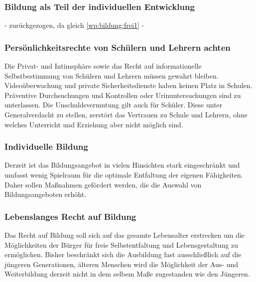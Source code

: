 \label{wp:bildung:frei2}

\subsubsection{Bildung als Teil der individuellen Entwicklung}
- zurückgezogen, da gleich \ref{wp:bildung:frei1} -
 

\subsubsection{Persönlichkeitsrechte von Schülern und Lehrern achten}
\abstimmung
Die Privat- und Intimsphäre sowie das Recht auf informationelle Selbstbestimmung von Schülern und Lehrern müssen gewahrt bleiben. Videoüberwachung und private Sicherheitsdienste haben keinen Platz in Schulen. Präventive Durchsuchungen und Kontrollen oder Urinuntersuchungen sind zu unterlassen. Die Unschuldsvermutung gilt auch für Schüler. Diese unter Generalverdacht zu stellen, zerstört das Vertrauen zu Schule und Lehrern, ohne welches Unterricht und Erziehung aber nicht möglich sind.
 

\subsubsection{Individuelle Bildung}
\abstimmung
Derzeit ist das Bildungsangebot in vielen Hinsichten stark eingeschränkt und umfasst wenig Spielraum für die optimale Entfaltung der eigenen Fähigkeiten. Daher sollen Maßnahmen gefördert werden, die die Auswahl von Bildungsangeboten erhöht.

\subsubsection{Lebenslanges Recht auf Bildung}
\abstimmung
Das Recht auf Bildung soll sich auf das gesamte Lebensalter erstrecken um die Möglichkeiten der Bürger für freie Selbstentfaltung und Lebensgestaltung zu ermöglichen. Bisher beschränkt sich die Ausbildung fast ausschließlich auf die jüngeren Generationen, älteren Menschen wird die Möglichkeit der Aus- und Weiterbildung derzeit nicht in dem selbem Maße zugestanden wie den Jüngeren.

